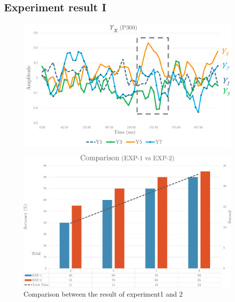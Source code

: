 \subsection{Experiment result I}

\begin{figure}[ht]
	\centering
	\includegraphics[width=\textwidth]{chapter7/erp_result.pdf}
	\caption{}
\end{figure}

\begin{figure}[ht]
	\centering
	\includegraphics[width=\textwidth]{chapter7/result_12.pdf}
	\caption{Comparison between the result of experiment1 and 2}
\end{figure}

